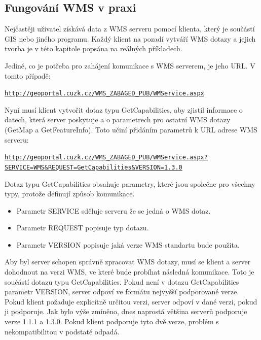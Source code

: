 \documentclass[a4paper,12pt]{article}
\begin{document}
\subsection{Fungování WMS v praxi}

 
Nejčastěji uživatel získává data z WMS serveru pomocí klienta, který je součástí GIS nebo jiného programu. Každý klient na pozadí vytváří WMS dotazy a jejich 
tvorba je v této kapitole popsána na reálných příkladech. 


\newpage
Jediné, co je potřeba pro zahájení komunikace s WMS serverem, je jeho URL. V tomto případě:
\begin{alltt}\footnotesize
\url{http://geoportal.cuzk.cz/WMS_ZABAGED_PUB/WMService.aspx}
\end{alltt}

Nyní musí klient vytvořit dotaz typu GetCapabilities, aby zjistil informace o datech, která server poskytuje a o parametrech pro ostatní WMS dotazy (GetMap a GetFeatureInfo).
Toto učiní přidáním parametrů k URL adrese WMS serveru:

\newcommand{\CUZKgetCap}{http://geoportal.cuzk.cz/WMS_ZABAGED_PUB/WMService.aspx?SERVICE=WMS&REQUEST=GetCapabilities&VERSION=1.3.0}
\begin{alltt}\footnotesize
\href{\CUZKgetCap}{http://geoportal.cuzk.cz/WMS_ZABAGED_PUB/WMService.aspx?}
\href{\CUZKgetCap}{SERVICE=WMS&REQUEST=GetCapabilities&VERSION=1.3.0}
\end{alltt}

 Dotaz typu GetCapabilities obsahuje parametry, které jsou společne pro všechny typy, protože definují způsob komunikace.
\begin{itemize}
  \item Parametr SERVICE sděluje serveru že se jedná o WMS dotaz. 
  \item Parametr REQUEST popisuje typ dotazu. 
  \item Parametr VERSION popisuje jaká verze WMS standartu bude použita.
\end{itemize}

Aby byl server schopen správně zpracovat WMS dotazy, musí se klient a server dohodnout na verzi WMS, ve které bude probíhat následná komunikace.
Toto je součástí dotazu typu GetCapabilities. Pokud není v dotazu GetCapabilities parametr VERSION, server odpoví ve formátu nejvyšší podporované verze. 
Pokud klient požaduje explicitně určitou verzi, server odpoví v dané verzi, pokud ji podporuje. Jak bylo výše zmíněno, dnes naprostá většina serverů podporuje 
verze 1.1.1 a 1.3.0. Pokud klient podporuje tyto dvě verze, problém s nekompatibilitou v podstatě odpadá.
\end{document}

